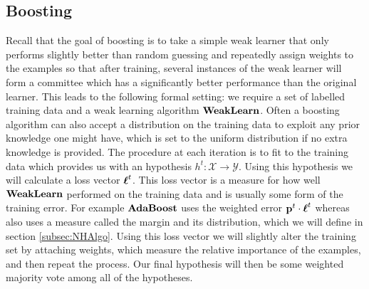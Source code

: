 \subsection{Boosting}
\label{subsec:boosting}
Recall that the goal of boosting is to take a simple weak learner that only performs slightly better than random guessing and repeatedly assign weights to the examples so that after training, several instances of the weak learner will form a committee which has a significantly better performance than the original learner.
This leads to the following formal setting: we require a set of labelled training data and a weak learning algorithm $\textbf{WeakLearn}$. Often a boosting algorithm can also accept a distribution on the training data to exploit any prior knowledge one might have, which is set to the uniform distribution if no extra knowledge is provided. The procedure at each iteration is to fit \weak to the training data which provides us with an hypothesis $h^t:\mathcal X \to \mathcal Y$. Using this hypothesis we will calculate a loss vector $\boldsymbol\ell^t$. This loss vector is a measure for how well $\textbf{WeakLearn}$ performed on the training data and is usually some form of the training error. For example $\textbf{AdaBoost}$ uses the weighted error $\mathbf{p}^t\cdot\boldsymbol\ell^t$ whereas \NHB also uses a measure called the margin and its distribution, which we will define in section \ref{subsec:NHAlgo}. Using this loss vector we will slightly alter the training set by attaching weights, which measure the relative importance of the examples, and then repeat the process. Our final hypothesis will then be some weighted majority vote among all of the hypotheses. 

\section{\adaB}
\label{sec:ada}

